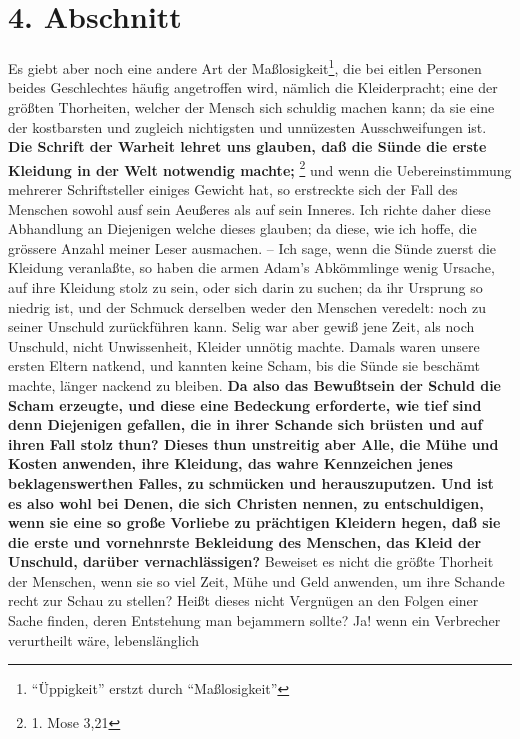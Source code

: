 \section{4. Abschnitt} \label{kap14_ab4}

Es giebt aber noch eine andere Art der Maßlosigkeit\footnote{"`Üppigkeit"' erstzt durch "`Maßlosigkeit"'}, die bei eitlen Personen beides
Geschlechtes häufig angetroffen wird, nämlich die Kleiderpracht; eine der
größten Thorheiten, welcher der Mensch sich schuldig machen kann; da sie eine
der kostbarsten und zugleich nichtigsten und unnüzesten Ausschweifungen ist. \textbf{Die
Schrift der Warheit lehret uns glauben, daß die Sünde die erste Kleidung in der
Welt notwendig machte;}
\footnote{1. Mose 3,21}
und wenn die Uebereinstimmung
mehrerer Schriftsteller einiges Gewicht hat, so erstreckte sich der Fall des
Menschen sowohl ausf sein Aeußeres als auf sein Inneres. Ich richte daher diese
Abhandlung an Diejenigen welche dieses glauben; da diese, wie ich hoffe, die
grössere Anzahl meiner Leser ausmachen. -- Ich sage, wenn die Sünde zuerst die
Kleidung veranlaßte, so haben die armen Adam’s Abkömmlinge wenig Ursache, auf
ihre Kleidung stolz zu sein, oder sich darin zu suchen; da ihr Ursprung so
niedrig ist, und der Schmuck derselben weder den Menschen veredelt: noch zu
seiner Unschuld zurückführen kann. Selig war aber gewiß jene Zeit, als noch
Unschuld, nicht Unwissenheit, Kleider unnötig machte. Damals waren unsere ersten
Eltern natkend, und kannten keine Scham, bis die Sünde sie beschämt machte,
länger nackend zu bleiben. \textbf{Da also das Bewußtsein der Schuld die Scham erzeugte,
und diese eine Bedeckung erforderte, wie tief sind denn Diejenigen gefallen, die
in ihrer Schande sich brüsten und auf ihren Fall stolz thun? Dieses thun
unstreitig aber Alle, die Mühe und Kosten anwenden, ihre Kleidung, das wahre
Kennzeichen jenes beklagenswerthen Falles, zu schmücken und herauszuputzen. Und
ist es also wohl bei Denen, die sich Christen nennen, zu entschuldigen, wenn sie
eine so große Vorliebe zu prächtigen Kleidern hegen, daß sie die erste und
vornehnrste Bekleidung des Menschen, das Kleid der Unschuld, darüber
vernachlässigen?} Beweiset es nicht die größte Thorheit der Menschen, wenn sie so
viel Zeit, Mühe und Geld anwenden, um ihre Schande recht zur Schau zu stellen?
Heißt dieses nicht Vergnügen an den Folgen einer Sache finden, deren Entstehung
man bejammern sollte? Ja! wenn ein Verbrecher verurtheilt wäre, lebenslänglich
